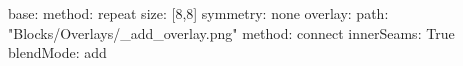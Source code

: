 base:
  method: repeat
  size: [8,8]
  symmetry: none
overlay:
  path: "Blocks/Overlays/_add_overlay.png"
  method: connect
  innerSeams: True
blendMode: add
